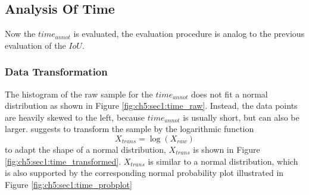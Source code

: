\subsection{Analysis Of Time}\label{ord:ch5:sec1:subsec3}
Now the $time_{annot}$ is evaluated, the evaluation procedure is analog to the previous evaluation of the $IoU$.
\subsubsection{Data Transformation}

The histogram of the raw sample for the $time_{annot}$ does not fit a normal distribution as shown in Figure \ref{fig:ch5:sec1:time_raw}.
Instead, the data points are heavily skewed to the left, because $time_{annot}$ is usually short, but can also be larger.
\cite{PS16-Statistics} suggests to transform the sample by the logarithmic function 
\begin{equation} \label{equ:trans_time}
	X_{trans} = \log \left( X_{raw} \right) 
\end{equation}
to adapt the shape of a normal distribution, $X_{trans}$ is shown in Figure \ref{fig:ch5:sec1:time_transformed}.
$X_{trans}$ is similar to a normal distribution, which is also supported by the corresponding normal probability plot illustrated in Figure \ref{fig:ch5:sec1:time_probplot}

